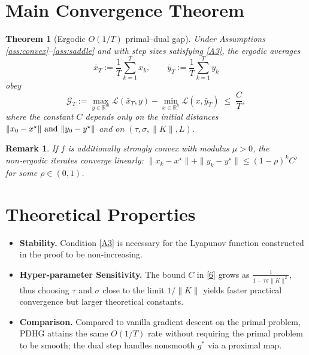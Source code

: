 \documentclass{article}
\newtheorem{theorem}{Theorem}
\newtheorem{remark}{Remark}
\begin{document}
\section*{Main Convergence Theorem}
\begin{theorem}[Ergodic $O(1/T)$ primal–dual gap]\label{thm:rate}
Under Assumptions \ref{ass:convex}–\ref{ass:saddle} and with step sizes satisfying \eqref{A3}, the ergodic averages
\[
\bar{x}_{T}:=\frac{1}{T}\sum_{k=1}^{T}x_{k},\qquad
\bar{y}_{T}:=\frac{1}{T}\sum_{k=1}^{T}y_{k}
\]
obey
\[
\mathcal{G}_{T}:=
\max_{y\in\mathbb{R}^{m}}\mathcal{L}(\bar{x}_{T},y)-\min_{x\in\mathbb{R}^{n}}\mathcal{L}(x,\bar{y}_{T})
\;\le\;
\frac{C}{T},
\tag{6}
\]
where the constant $C$ depends only on the initial distances
\(
\|x_{0}-x^{\star}\|$ and $\|y_{0}-y^{\star}\|
\)
and on $(\tau,\sigma,\|K\|,L)$.
\end{theorem}

\begin{remark}
If $f$ is additionally strongly convex with modulus $\mu>0$, the non‑ergodic iterates converge linearly:
\(
\|x_{k}-x^{\star}\|+\|y_{k}-y^{\star}\|\le (1-\rho)^{k}C'
\)
for some $\rho\in(0,1)$.
\end{remark}

\section*{Theoretical Properties}
\begin{itemize}
\item \textbf{Stability.} Condition \eqref{A3} is necessary for the Lyapunov function constructed in the proof to be non‑increasing.
\item \textbf{Hyper‑parameter Sensitivity.} The bound $C$ in \eqref{6} grows as $\frac{1}{1-\tau\sigma\|K\|^{2}}$, thus choosing $\tau$ and $\sigma$ close to the limit $1/\|K\|$ yields faster practical convergence but larger theoretical constants.
\item \textbf{Comparison.} Compared to vanilla gradient descent on the primal problem, PDHG attains the same $O(1/T)$ rate without requiring the primal problem to be smooth; the dual step handles nonsmooth $g^{*}$ via a proximal map.
\end{itemize}
\end{document}
